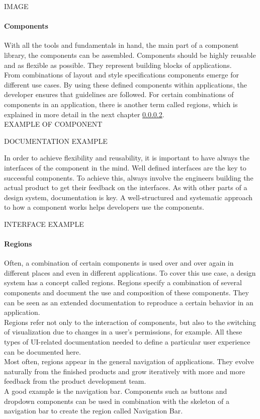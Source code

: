 IMAGE
\paragraph{Components}
With all the tools and fundamentals in hand, the main part of a component library, the components can be assembled. Components should be highly reusable and as flexible as possible. They represent building blocks of applications.  \\
From combinations of layout and style specifications components emerge for different use cases. By using these defined components within applications, the developer ensures that guidelines are followed. For certain combinations of components in an application, there is another term called regions, which is explained in more detail in the next chapter \ref{regions}. \\


EXAMPLE OF COMPONENT


DOCUMENTATION EXAMPLE


In order to achieve flexibility and reusability, it is important to have always the interfaces of the component in the mind. Well defined interfaces are the key to successful components. To achieve this, always involve the engineers building the actual product to get their feedback on the interfaces. As with other parts of a design system, documentation is key. A well-structured and systematic approach to how a component works helps developers use the components.  \cite{vesselov_building_2019}



INTERFACE EXAMPLE
\paragraph{Regions} \label{regions}
Often, a combination of certain components is used over and over again in different places and even in different applications. To cover this use case, a design system has a concept called regions. Regions specify a combination of several components and document the use and composition of these components. They can be seen as an extended documentation to reproduce a certain behavior in an application. 
\\
Regions refer not only to the interaction of components, but also to the switching of visualization due to changes in a user's permissions, for example. All these types of UI-related documentation needed to define a particular user experience can be documented here.   \cite{vesselov_building_2019}
\\
Most often, regions appear in the general navigation of applications. They evolve naturally from the finished products and grow iteratively with more and more feedback from the product development team.
\\
A good example is the navigation bar. Components such as buttons and dropdown components can be used in combination with the skeleton of a navigation bar to create the region called Navigation Bar. 
